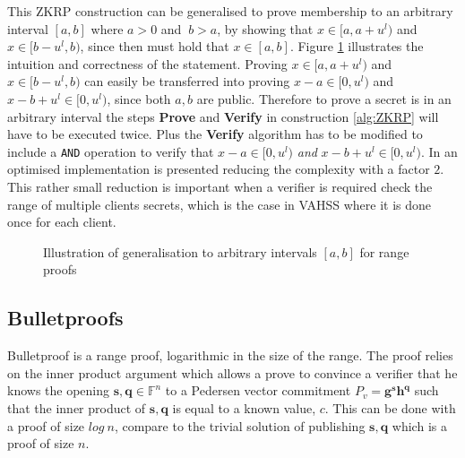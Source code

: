 This ZKRP construction can be generalised to  prove membership to an arbitrary interval $[a,b]$ where $a>0$ and  $\:b>a$, by showing  that $x\in[a,a+u^l)$ and $x\in[b-u^l,b)$, since then must hold that $x\in[a,b]$. Figure \ref{fig:interval} illustrates the intuition and correctness of the statement.  Proving $x\in[a,a+u^l)$ and $x\in[b-u^l,b)$ can easily be transferred into proving $x-a\in[0,u^l)$ and $x-b+u^l\in[0,u^l)$, since both $a,b$ are public. Therefore to prove a secret is in an arbitrary interval the steps \textbf{Prove} and \textbf{Verify} in construction \ref{alg:ZKRP} will have to be executed twice. Plus the  \textbf{Verify} algorithm has to be modified to include a \texttt{AND} operation to verify that  $x-a\in[0,u^l)$ \textit{and} $x-b+u^l\in[0,u^l)$.  In \cite{arbitary_range_opt} an optimised implementation is presented  reducing the complexity with a factor $2$. This rather small reduction is important when a verifier is required check the range of multiple clients secrets, which is the case in VAHSS where it is done once for each client. 

\begin{figure}[]
    \centering
    \caption{Illustration of generalisation to arbitrary intervals $[a,b]$ for range proofs}
    \label{fig:interval}
\end{figure}


\subsection{Bulletproofs}
Bulletproof is a range proof, logarithmic in the size of the range. The proof relies on the inner product argument which allows a prove to convince a verifier that he knows the opening $\bm{s},\bm{q}\in\mathds{F}^n$ to a Pedersen vector commitment $P_v = \bm{g}^{\bm{s}}\bm{h}^{\bm{q}}$ such that the inner product of $\bm{s},\bm{q}$ is equal to a known value, $c$. This can be done with a proof of size $log\: n$, compare to the trivial solution of publishing $\bm{s},\bm{q}$ which is a proof of size $n$.

